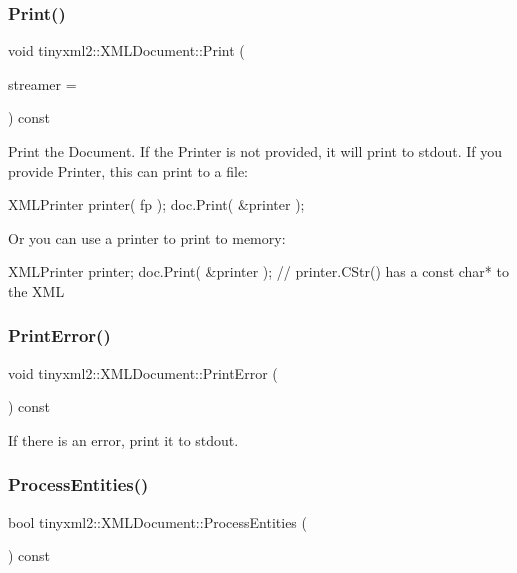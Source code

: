 \subsubsection{\texorpdfstring{Print()}{Print()}}
{\footnotesize\ttfamily void tinyxml2\+::\+X\+M\+L\+Document\+::\+Print (\begin{DoxyParamCaption}\item[{\hyperlink{classtinyxml2_1_1_x_m_l_printer}{X\+M\+L\+Printer} $\ast$}]{streamer = {} }\end{DoxyParamCaption}) const}

Print the Document. If the Printer is not provided, it will print to stdout. If you provide Printer, this can print to a file\+: \begin{DoxyVerb}XMLPrinter printer( fp );
doc.Print( &printer );
\end{DoxyVerb}


Or you can use a printer to print to memory\+: \begin{DoxyVerb}XMLPrinter printer;
doc.Print( &printer );
// printer.CStr() has a const char* to the XML
\end{DoxyVerb}
 \mbox{\label{classtinyxml2_1_1_x_m_l_document_a1d033945b42e125d933d6231e4571552}} 
\subsubsection{\texorpdfstring{Print\+Error()}{PrintError()}}
{\footnotesize\ttfamily void tinyxml2\+::\+X\+M\+L\+Document\+::\+Print\+Error (\begin{DoxyParamCaption}{ }\end{DoxyParamCaption}) const}



If there is an error, print it to stdout. 

\mbox{\label{classtinyxml2_1_1_x_m_l_document_a53e6c035b1b539563fef8c817fb30469}} 
\subsubsection{\texorpdfstring{Process\+Entities()}{ProcessEntities()}}
{\footnotesize\ttfamily bool tinyxml2\+::\+X\+M\+L\+Document\+::\+Process\+Entities (\begin{DoxyParamCaption}{ }\end{DoxyParamCaption}) const\hspace{0.3cm}{\ttfamily [inline]}}

